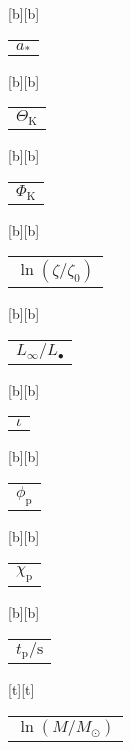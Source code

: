 %    
%
%
\begin{psfrags}%
\psfragscanon%
%
[b][b]{\color[rgb]{0,0,0}\setlength{\tabcolsep}{0pt}\begin{tabular}{c}{$a_\ast$}\end{tabular}}%
[b][b]{\color[rgb]{0,0,0}\setlength{\tabcolsep}{0pt}\begin{tabular}{c}{$\Theta_\mathrm{K}$}\end{tabular}}%
[b][b]{\color[rgb]{0,0,0}\setlength{\tabcolsep}{0pt}\begin{tabular}{c}{$\Phi_\mathrm{K}$}\end{tabular}}%
[b][b]{\color[rgb]{0,0,0}\setlength{\tabcolsep}{0pt}\begin{tabular}{c}{$\ln(\zeta/\zeta_0)$}\end{tabular}}%
[b][b]{\color[rgb]{0,0,0}\setlength{\tabcolsep}{0pt}\begin{tabular}{c}{$L_\infty/L_\bullet$}\end{tabular}}%
[b][b]{\color[rgb]{0,0,0}\setlength{\tabcolsep}{0pt}\begin{tabular}{c}{$\iota$}\end{tabular}}%
[b][b]{\color[rgb]{0,0,0}\setlength{\tabcolsep}{0pt}\begin{tabular}{c}{$\phi_\mathrm{p}$}\end{tabular}}%
[b][b]{\color[rgb]{0,0,0}\setlength{\tabcolsep}{0pt}\begin{tabular}{c}{$\chi_\mathrm{p}$}\end{tabular}}%
[b][b]{\color[rgb]{0,0,0}\setlength{\tabcolsep}{0pt}\begin{tabular}{c}{$t_\mathrm{p}/\mathrm{s}$}\end{tabular}}%
[t][t]{\color[rgb]{0,0,0}\setlength{\tabcolsep}{0pt}\begin{tabular}{c}{$\ln(M/M_\odot)$}\end{tabular}}%

\end{psfrags}
